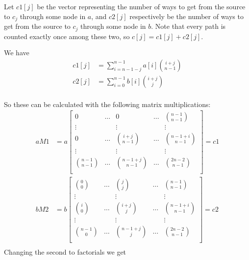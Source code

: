 \documentclass{article}
\begin{document}
Let $c1[j]$ be the vector representing the number of ways to get from the source to $c_{j}$ through some node in $a$,
and $c2[j]$ respectively be the number of ways to get from the source to $c_{j}$ through some node in $b$. Note that every
path is counted exactly once among these two, so $c[j] = c1[j] + c2[j]$.

We have
\begin{align*}
c1[j] &= \sum_{i = n-1-j}^{n-1} a[i] \binom{i+j}{n-1}\\
c2[j] &= \sum_{i = 0}^{n-1} b[i] \binom{i+j}{j}\\
\end{align*}

So these can be calculated with the following matrix multiplications:
\begin{align*}
aM1 &= a\left[\begin{array}{ccccc}
	0			&\dots	&0			&\dots	&\binom{n-1}{n-1}\\
	\vdots			&	&\vdots			&	&\vdots\\
	0			&\dots	&\binom{i+j}{n-1}	&\dots	&\binom{n-1+i}{n-1}\\
	\vdots			&	&\vdots			&	&\vdots\\
	\binom{n-1}{n-1}	&\dots	&\binom{n-1+j}{n-1}	&\dots	&\binom{2n-2}{n-1}\\
\end{array}\right] = c1\\
bM2 &= b\left[\begin{array}{ccccc}
	\binom{0}{0}	&\dots	&\binom{j}{j}		&\dots	&\binom{n-1}{n-1}\\
	\vdots		&	&\vdots			&	&\vdots\\
	\binom{i}{0}	&\dots	&\binom{i+j}{j}		&\dots	&\binom{n-1+i}{n-1}\\
	\vdots		&	&\vdots			&	&\vdots\\
	\binom{n-1}{0}	&\dots	&\binom{n-1+j}{j}	&\dots	&\binom{2n-2}{n-1}\\
\end{array}\right] = c2\\
\end{align*}
Changing the second to factorials we get
\end{document}
